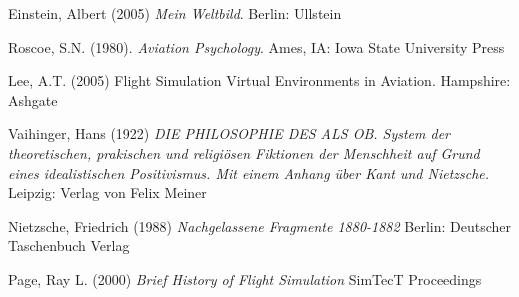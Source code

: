 \documentclass[12pt]{article}
\begin{document}
\newpage
%
%
\begin{thebibliography}{5}
%

Einstein, Albert (2005) {\sl Mein Weltbild}. Berlin: Ullstein

Roscoe, S.N. (1980). {\sl Aviation Psychology}. Ames, IA: Iowa State University Press

Lee, A.T. (2005) {Flight Simulation Virtual Environments in Aviation}. Hampshire: Ashgate

Vaihinger, Hans (1922) {\sl DIE PHILOSOPHIE DES ALS OB. System der theoretischen, prakischen und religiösen Fiktionen der Menschheit  auf Grund eines idealistischen Positivismus. Mit einem Anhang über Kant und Nietzsche.} Leipzig: Verlag von Felix Meiner

Nietzsche, Friedrich (1988) {\sl Nachgelassene Fragmente 1880-1882} Berlin: Deutscher Taschenbuch Verlag

Page, Ray L. (2000) {\sl Brief History of Flight Simulation} SimTecT Proceedings

\end{thebibliography}
\end{document}
